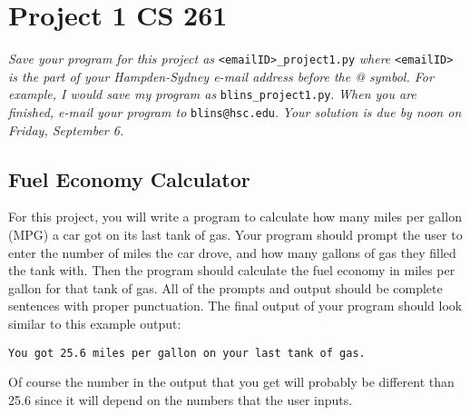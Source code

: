\documentclass[12pt]{article}
\begin{document}
\section*{Project 1 \hfill CS 261}

\textit{Save your program for this project as} \verb|<emailID>_project1.py| \textit{where} \verb|<emailID>| \textit{is the part of your Hampden-Sydney e-mail address before the @ symbol.  For example, I would save my program as} \verb|blins_project1.py|. \textit{When you are finished, e-mail your program to} \verb|blins@hsc.edu|. \textit{Your solution is due by noon on Friday, September 6. }

\subsection*{Fuel Economy Calculator}

For this project, you will write a program to calculate how many miles per gallon (MPG) a car got on its last tank of gas.  Your program should prompt the user to enter the number of miles the car drove, and how many gallons of gas they filled the tank with.  Then the program should calculate the fuel economy in miles per gallon for that tank of gas.  All of the prompts and output should be complete sentences with proper punctuation.  The final output of your program should look similar to this example output:

\begin{verbatim}
You got 25.6 miles per gallon on your last tank of gas.
\end{verbatim}

\noindent
Of course the number in the output that you get will probably be different than 25.6 since it will depend on the numbers that the user inputs. 
\end{document}

